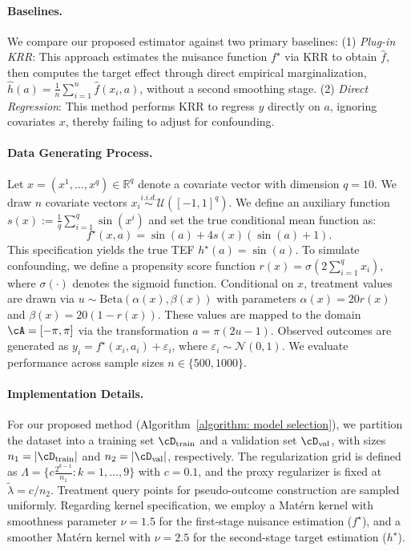 \documentclass[english,11pt]{article}
\begin{document}
\paragraph{Baselines.}
We compare our proposed estimator against two primary baselines:
(1) \textit{Plug-in KRR}: This approach estimates the nuisance function $f^\star$ via KRR to obtain $\hat{f}$, then computes the target effect through direct empirical marginalization, $\hat{h}(a) = \frac{1}{n} \sum_{i=1}^n \hat{f}(x_i, a)$, without a second smoothing stage.
(2) \textit{Direct Regression}: This method performs KRR to regress $y$ directly on $a$, ignoring covariates $x$, thereby failing to adjust for confounding.

\paragraph{Data Generating Process.}
Let $x=(x^1,\ldots,x^q)\in\mathbb{R}^q$ denote a covariate vector with dimension $q=10$. We draw $n$ covariate vectors $x_i\stackrel{i.i.d.}{\sim}\mathcal{U}([-1,1]^q)$.
We define an auxiliary function $s(x) := \frac{1}{q} \sum_{i=1}^q \sin(x^i)$ and set the true conditional mean function as:
\[
f^\star(x,a)=\sin(a) + 4 s(x)(\sin(a)+1).
\]
This specification yields the true TEF $h^\star(a)=\sin(a)$.
To simulate confounding, we define a propensity score function $r(x) = \sigma(2 \sum_{i=1}^q x_i)$, where $\sigma(\cdot)$ denotes the sigmoid function. Conditional on $x$, treatment values are drawn via $u\sim\mathrm{Beta}(\alpha(x),\beta(x))$ with parameters $\alpha(x) = 20 r(x)$ and $\beta(x) = 20 (1-r(x))$. These values are mapped to the domain $\cA = [-\pi, \pi]$ via the transformation $a=\pi(2u-1)$.
Observed outcomes are generated as $y_i = f^\star(x_i, a_i) + \varepsilon_i$, where $\varepsilon_i \sim \mathcal{N}(0,1)$. We evaluate performance across sample sizes $n\in\{500,1000\}$.

\paragraph{Implementation Details.}
For our proposed method (Algorithm~\ref{algorithm: model selection}), we partition the dataset into a training set $\cD_{\text{train}}$ and a validation set $\cD_{\text{val}}$, with sizes $n_1 = |\cD_{\text{train}}|$ and $n_2 = |\cD_{\text{val}}|$, respectively.
The regularization grid is defined as $\Lambda = \{ c \frac{2^{k-1}}{n_1} : k = 1,\dots,9 \}$ with $c = 0.1$, and the proxy regularizer is fixed at $\tilde{\lambda} = c/n_2$.
Treatment query points for pseudo-outcome construction are sampled uniformly.
Regarding kernel specification, we employ a Mat\'ern kernel with smoothness parameter $\nu=1.5$ for the first-stage nuisance estimation ($f^\star$), and a smoother Mat\'ern kernel with $\nu=2.5$ for the second-stage target estimation ($h^\star$).
\end{document}
